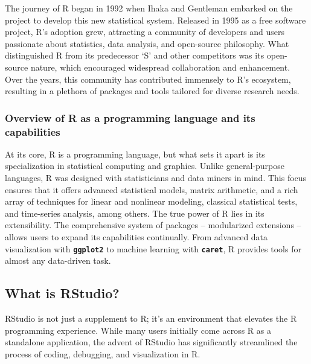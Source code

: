 \documentclass[
  b5paper]{book}
\begin{document}
The journey of R began in 1992 when Ihaka and Gentleman embarked on the project to develop this new statistical system. Released in 1995 as a free software project, R's adoption grew, attracting a community of developers and users passionate about statistics, data analysis, and open-source philosophy. What distinguished R from its predecessor `S' and other competitors was its open-source nature, which encouraged widespread collaboration and enhancement. Over the years, this community has contributed immensely to R's ecosystem, resulting in a plethora of packages and tools tailored for diverse research needs.

\hypertarget{overview-of-r-as-a-programming-language-and-its-capabilities}{%
\subsubsection*{Overview of R as a programming language and its capabilities}\label{overview-of-r-as-a-programming-language-and-its-capabilities}}

At its core, R is a programming language, but what sets it apart is its specialization in statistical computing and graphics. Unlike general-purpose languages, R was designed with statisticians and data miners in mind. This focus ensures that it offers advanced statistical models, matrix arithmetic, and a rich array of techniques for linear and nonlinear modeling, classical statistical tests, and time-series analysis, among others. The true power of R lies in its extensibility. The comprehensive system of packages -- modularized extensions -- allows users to expand its capabilities continually. From advanced data visualization with \textbf{\texttt{ggplot2}} to machine learning with \textbf{\texttt{caret}}, R provides tools for almost any data-driven task.

\hypertarget{what-is-rstudio}{%
\subsection*{What is RStudio?}\label{what-is-rstudio}}

RStudio is not just a supplement to R; it's an environment that elevates the R programming experience. While many users initially come across R as a standalone application, the advent of RStudio has significantly streamlined the process of coding, debugging, and visualization in R.
\end{document}
